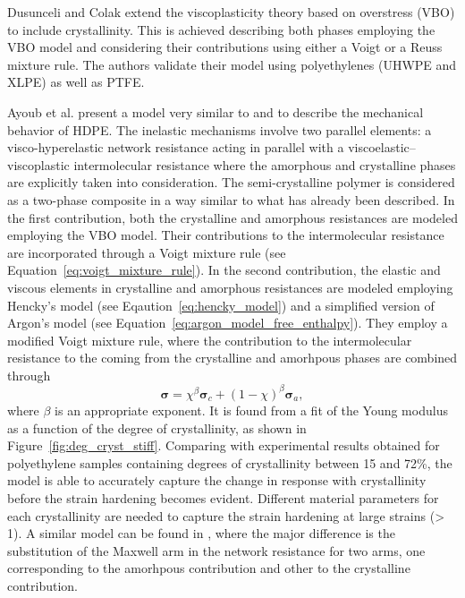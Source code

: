 Dusunceli and Colak \citep{dusunceliModellingEffectsDegree2008} extend the viscoplasticity theory based on overstress (VBO) to include crystallinity.
This is achieved describing both phases employing the VBO model and considering their contributions using either a Voigt or a Reuss mixture rule.
The authors validate their model using polyethylenes (UHWPE and XLPE) as well as PTFE.

Ayoub et al. \citep{ayoubModellingLargeDeformation2010, ayoubEffectsCrystalContent2011} present a model very similar to \cite{ahziModelingDeformationBehavior2003} and \cite{boyceConstitutiveModelFinite2000} to describe the mechanical behavior of HDPE.
The inelastic mechanisms involve two parallel elements: a visco-hyperelastic network resistance acting in parallel with a viscoelastic–viscoplastic intermolecular resistance where the amorphous and crystalline phases are explicitly taken into consideration.
The semi-crystalline polymer is considered as a two-phase composite in a way similar to what has already been described.
In the first contribution, both the crystalline and amorphous resistances are modeled employing the VBO model.
Their contributions to the intermolecular resistance are incorporated through a Voigt mixture rule (see Equation~\eqref{eq:voigt_mixture_rule}).
In the second contribution, the elastic and viscous elements in crystalline and amorphous resistances are modeled employing Hencky's model (see Eqaution~\eqref{eq:hencky_model}) and a simplified version of Argon's model (see Equation~\eqref{eq:argon_model_free_enthalpy}).
They employ a modified Voigt mixture rule, where the contribution to the intermolecular resistance to the coming from the crystalline and amorhpous phases are combined through
\begin{equation}
  \label{eq:mod_voigt_mixture_rule}
  \bm \sigma = \chi^\beta \bm \sigma_c + (1-\chi)^\beta \bm \sigma_a,
\end{equation}
where $\beta$ is an appropriate exponent.
It is found from a fit of the Young modulus as a function of the degree of crystallinity, as shown in Figure~\ref{fig:deg_cryst_stiff}.
Comparing with experimental results obtained for polyethylene samples containing degrees of crystallinity between 15 and 72\%, the model is able to accurately capture the change in response with crystallinity before the strain hardening becomes evident.
Different material parameters for each crystallinity are needed to capture the strain hardening at large strains (> 1).
A similar model can be found in \citep{abdul-hameedTwophaseHyperelasticviscoplasticConstitutive2014}, where the major difference is the substitution of the Maxwell arm in the network resistance for two arms, one corresponding to the amorhpous contribution and other to the crystalline contribution.

